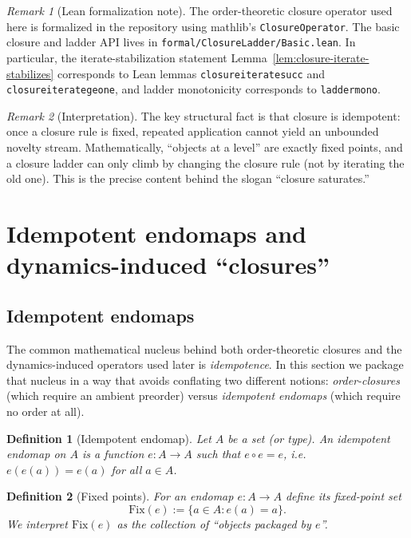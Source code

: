 \documentclass[11pt]{article}
\newtheorem{definition}{Definition}
\theoremstyle{remark}
\newtheorem{remark}{Remark}
\begin{document}
\begin{remark}[Lean formalization note]\label{rem:lean-closure}
The order-theoretic closure operator used here is formalized in the repository using mathlib's
\texttt{ClosureOperator}. The basic closure and ladder API lives in
\texttt{formal/ClosureLadder/Basic.lean}. In particular, the iterate-stabilization statement
Lemma~\ref{lem:closure-iterate-stabilizes} corresponds to Lean lemmas
\texttt{closure\*iterate\*succ} and \texttt{closure\*iterate\*ge\*one}, and ladder monotonicity
corresponds to \texttt{ladder\*mono}.
\end{remark}

\begin{remark}[Interpretation]
The key structural fact is that closure is idempotent: once a closure rule is fixed, repeated application cannot yield an unbounded novelty stream.
Mathematically, ``objects at a level'' are exactly fixed points, and a closure ladder can only climb by changing the closure rule (not by iterating the old one).
This is the precise content behind the slogan ``closure saturates.''
\end{remark}

\section{Idempotent endomaps and dynamics-induced ``closures''}\label{sec:idempotent-endo}
\subsection{Idempotent endomaps}

The common mathematical nucleus behind both order-theoretic closures and the
dynamics-induced operators used later is \emph{idempotence}.  In this section we
package that nucleus in a way that avoids conflating two different notions:
\emph{order-closures} (which require an ambient preorder) versus \emph{idempotent
endomaps} (which require no order at all).

\begin{definition}[Idempotent endomap]
Let $A$ be a set (or type). An \emph{idempotent endomap} on $A$ is a function
$e : A \to A$ such that $e \circ e = e$, i.e.\ $e(e(a)) = e(a)$ for all $a\in A$.
\end{definition}

\begin{definition}[Fixed points]
For an endomap $e : A \to A$ define its fixed-point set
\[
\mathrm{Fix}(e) := \{a\in A : e(a)=a\}.
\]
We interpret $\mathrm{Fix}(e)$ as the collection of ``objects packaged by $e$''.
\end{definition}
\end{document}
